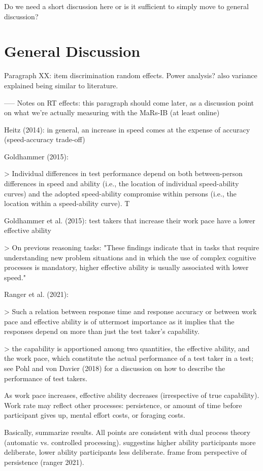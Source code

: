 \documentclass[a4paper,man,natbib]{apa6}
\begin{document}
Do we need a short discussion here or is it sufficient to simply move to general discussion? 

\section{General Discussion}

Paragraph XX: item discrimination random effects. Power analysis? also variance explained being similar to literature.

-----
Notes on RT effects: this paragraph should come later, as a discussion point on what we're actually measuring with the MaRs-IB (at least online)

Heitz (2014): in general, an increase in speed comes at the expense of accuracy (speed-accuracy trade-off)

Goldhammer (2015): 

> Individual differences in test performance depend on both between-person differences in speed and ability (i.e., the location of individual speed-ability curves) and the adopted speed-ability compromise within persons (i.e., the location within a speed-ability curve). T

Goldhammer et al. (2015): test takers that increase their work pace have a lower effective ability

> On previous reasoning tasks: "These findings indicate that in tasks that require understanding new problem situations and in which the use of complex cognitive processes is mandatory, higher effective ability is usually associated with lower speed." 

Ranger et al. (2021): 

> Such a relation between response time and response accuracy or between work pace and effective ability is of uttermost importance as it implies that the responses depend on more than just the test taker’s capability.

> the capability is apportioned among two quantities, the effective ability, and the work pace, which constitute the actual performance of a test taker in a test; see Pohl and von Davier (2018) for a discussion on how to describe the performance of test takers. 

As work pace increases, effective ability decreases (irrespective of true capability). Work rate may reflect other processes: persistence, or amount of time before participant gives up, mental effort costs, or foraging costs.  

Basically, summarize results. All points are consistent with dual process theory (automatic vs. controlled processing). suggestins higher ability participants more deliberate, lower ability participants less deliberate. frame from perspective of persistence (ranger 2021).
\end{document}
